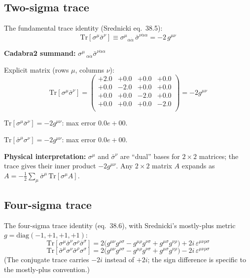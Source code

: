 \documentclass[12pt]{article}
\newcommand{\verified}[1]{\textcolor{verifygreen}{\checkmark\; #1}}
\newcommand{\dal}{\dot{\alpha}}
\newcommand{\sigmabar}{\bar{\sigma}}
\begin{document}
\subsection{Two-sigma trace}

The fundamental trace identity (Srednicki eq.~38.5):
\begin{equation}
  \boxed{
    \mathrm{Tr}[\sigma^\mu\bar\sigma^\nu]
    \equiv \sigma^\mu{}_{\alpha\dot\alpha}\,\bar\sigma^{\nu\dot\alpha\alpha}
    = -2\,g^{\mu\nu}
  }
  \tag{38.5}
\end{equation}

\textbf{Cadabra2 summand:} $\sigma^{\mu}\,_{\alpha \dal} \sigmabar^{\nu \dal \alpha}$

Explicit matrix (rows $\mu$, columns $\nu$):
\[
  \mathrm{Tr}[\sigma^\mu\bar\sigma^\nu] =
  \begin{pmatrix}
  +2.0 & +0.0 & +0.0 & +0.0 \\
  +0.0 & -2.0 & +0.0 & +0.0 \\
  +0.0 & +0.0 & -2.0 & +0.0 \\
  +0.0 & +0.0 & +0.0 & -2.0 \\
  \end{pmatrix}
  = -2g^{\mu\nu}
\]

\verified{$\mathrm{Tr}[\sigma^\mu\bar\sigma^\nu] = -2g^{\mu\nu}$: max error $0.0e+00$.}

\verified{$\mathrm{Tr}[\bar\sigma^\mu\sigma^\nu] = -2g^{\mu\nu}$: max error $0.0e+00$.}

\medskip
\textbf{Physical interpretation:}
$\sigma^\mu$ and $\bar\sigma^\nu$ are ``dual'' bases for $2\times 2$ matrices;
the trace gives their inner product $-2g^{\mu\nu}$.  Any $2\times2$ matrix $A$
expands as $A = -\frac{1}{2}\sum_\mu \bar\sigma^\mu\,\mathrm{Tr}[\sigma^\mu A]$.

\subsection{Four-sigma trace}

The four-sigma trace identity (eq.~38.6), with Srednicki's
mostly-plus metric $g = \mathrm{diag}(-1,+1,+1,+1)$:
\begin{equation}
  \boxed{
    \mathrm{Tr}[\sigma^\mu\bar\sigma^\nu\sigma^\rho\bar\sigma^\sigma]
    = 2\bigl(g^{\mu\nu}g^{\rho\sigma} - g^{\mu\rho}g^{\nu\sigma}
          + g^{\mu\sigma}g^{\nu\rho}\bigr)
      + 2i\,\varepsilon^{\mu\nu\rho\sigma}
  }
  \tag{38.6}
\end{equation}
\begin{equation}
  \mathrm{Tr}[\bar\sigma^\mu\sigma^\nu\bar\sigma^\rho\sigma^\sigma]
  = 2\bigl(g^{\mu\nu}g^{\rho\sigma} - g^{\mu\rho}g^{\nu\sigma}
        + g^{\mu\sigma}g^{\nu\rho}\bigr)
    - 2i\,\varepsilon^{\mu\nu\rho\sigma}
  \tag{38.6$'$}
\end{equation}
(The conjugate trace carries $-2i$ instead of $+2i$; the sign difference
is specific to the mostly-plus convention.)
\end{document}
